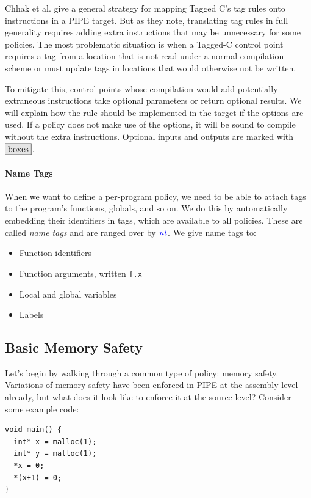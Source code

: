 \documentclass[acmsmall,review,anonymous]{acmart}\settopmatter{printfolios=true,printccs=false,printacmref=false}
\begin{document}
Chhak et al. \cite{Chhak21:Tagine} give a general strategy for mapping Tagged C's tag rules
onto instructions in a PIPE target. But as they note, translating tag rules in full generality
requires adding extra instructions that may be unnecessary for some policies. The most problematic
situation is when a Tagged-C control point requires a tag from a location that is not read under
a normal compilation scheme or must update tags in locations that would otherwise not be written.

To mitigate this, control points whose compilation would add potentially extraneous instructions
take optional parameters or return optional results. We will explain how the rule should be
implemented in the target if the options are used. If a policy does not make use of the options, it will
be sound to compile without the extra instructions. Optional inputs
and outputs are marked with \(\optional{boxes}\).

\paragraph*{Name Tags}

When we want to define a per-program policy, we need to be able to attach tags to the program's
functions, globals, and so on. We do this by automatically embedding their identifiers in tags,
which are available to all policies. These are called {\em name tags} and are ranged over by
\(\mathit{\color{blue} nt}\). We give name tags to:
\begin{itemize}
\item Function identifiers
\item Function arguments, written {\tt f.x}
\item Local and global variables
\item Labels
\end{itemize}

\subsection{Basic Memory Safety}
\label{sec:memsafe}

Let's begin by walking through a common type of policy: memory safety. Variations of memory safety
have been enforced in PIPE at the assembly level already, but what does it look like to enforce it
at the source level? Consider some example code:

\begin{verbatim}
void main() {
  int* x = malloc(1);
  int* y = malloc(1);
  *x = 0;
  *(x+1) = 0;
}
\end{verbatim}
\end{document}
